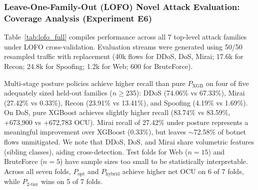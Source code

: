 \documentclass[journal,10pt,onecolumn]{IEEEtran}
\begin{document}
\subsubsection{Leave-One-Family-Out (LOFO) Novel Attack Evaluation: Coverage Analysis (Experiment E6)}
Table~\ref{tab:lofo_full} compiles performance across all 7 top-level attack families under LOFO cross-validation. Evaluation streams were generated using 50/50 resampled traffic with replacement (40k flows for DDoS, DoS, Mirai; 17.6k for Recon; 24.8k for Spoofing; 1.2k for Web; 600 for BruteForce).

Multi-stage posture policies achieve higher recall than pure $P_{\text{XGB}}$ on four of five adequately sized held-out families ($n \ge 235$): DDoS (74.06\% vs 67.33\%), Mirai (27.42\% vs 0.33\%), Recon (23.91\% vs 13.41\%), and Spoofing (4.19\% vs 1.69\%). On DoS, pure XGBoost achieves slightly higher recall (83.74\% vs 83.59\%, +673,900 vs +672,783 OCU). Mirai recall of 27.42\% under posture represents a meaningful improvement over XGBoost (0.33\%), but leaves $\sim$72.58\% of botnet flows unmitigated. We note that DDoS, DoS, and Mirai share volumetric features (sibling classes), aiding cross-detection. Test folds for Web ($n=15$) and BruteForce ($n=5$) have sample sizes too small to be statistically interpretable. Across all seven folds, $P_{\text{opt}}$ and $P_{\text{hybrid}}$ achieve higher net OCU on 6 of 7 folds, while $P_{2\text{-tier}}$ wins on 5 of 7 folds.
\end{document}
